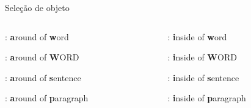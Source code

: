 \begin{frame}{Seleção de objeto}
    \begin{columns}
        \begin{column}{0.5\textwidth}
            \begin{widedescription}
                \item {}: \textbf{a}round of \textbf{w}ord
                \item {}: \textbf{a}round of \textbf{W}ORD
                \item {}: \textbf{a}round of \textbf{s}entence
                \item {}: \textbf{a}round of \textbf{p}aragraph
            \end{widedescription}
        \end{column}
        
        \begin{column}{0.5\textwidth}
            \begin{widedescription}
                \item {}: \textbf{i}nside of \textbf{w}ord
                \item {}: \textbf{i}nside of \textbf{W}ORD
                \item {}: \textbf{i}nside of \textbf{s}entence
                \item {}: \textbf{i}nside of \textbf{p}aragraph
            \end{widedescription}
        \end{column}
    \end{columns}
\end{frame}

